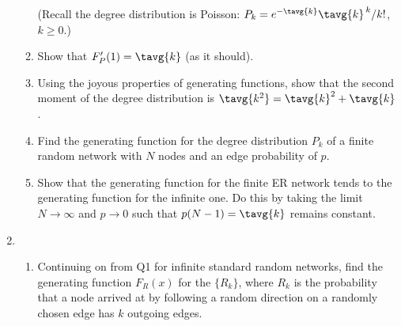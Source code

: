\begin{enumerate}
\begin{enumerate}
      (Recall the degree distribution is Poisson: 
      $P_{k} = e^{-{\tavg{k}}} {\tavg{k}}^{\, k} / k!$, $k \ge 0$.)

      
   \solutionstart


   \solutionend

    \item
      Show that $F_{P}'(1) = {\tavg{k}}$ (as it should).

      
   \solutionstart


   \solutionend

    \item
      Using the joyous properties of 
      generating functions, show that
      the second moment of the degree distribution
      is $\tavg{k^{2}}={\tavg{k}}^{2}+{\tavg{k}}$.

      
   \solutionstart


   \solutionend

    \item 
      Find the generating function for the degree distribution
      $P_{k}$ of a finite random network with $N$ nodes and
      an edge probability of $p$.

      
   \solutionstart


   \solutionend

    \item 
      Show that the generating function for the finite
      ER network tends to the generating function for 
      the infinite one.  Do this 
      by taking the limit $N\rightarrow \infty$
      and $p\rightarrow 0$ such that $p(N-1)=\tavg{k}$ 
      remains constant.

      
   \solutionstart


   \solutionend

    \end{enumerate}


  \item 
    \begin{enumerate}
    \item
      Continuing on from Q1 for infinite standard
      random networks, find the generating function $F_{R}(x)$ for the $\{R_{k}\}$, 
      where $R_{k}$ is the probability
      that a node arrived at by following a random direction
      on a randomly chosen edge has $k$ outgoing edges.


\end{enumerate}
\end{enumerate}
